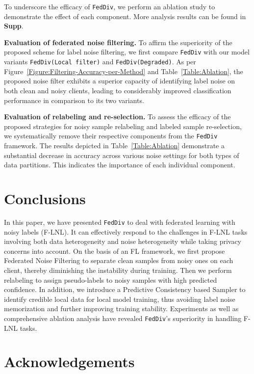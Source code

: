 \documentclass[letterpaper]{article} %
\begin{document}
To underscore the efficacy of \texttt{FedDiv}, we perform an ablation study to demonstrate the effect of each component. More analysis results can be found in \textbf{Supp}.

\noindent
\textbf{Evaluation of federated noise filtering.}
To affirm the superiority of the proposed scheme for label noise filtering, we first compare \texttt{FedDiv} with our model variants \texttt{FedDiv(Local filter)} and \texttt{FedDiv(Degraded)}. As per Figure~{\ref{Figure:Filtering-Accuracy-per-Method}} and Table~{\ref{Table:Ablation}}, the proposed noise filter exhibits a superior capacity of identifying label noise on both clean and noisy clients, leading to considerably improved classification performance in comparison to its two variants.

\noindent
\textbf{Evaluation of relabeling and re-selection.}
To assess the efficacy of the proposed strategies for noisy sample relabeling and labeled sample re-selection, we systematically remove their respective components from the \texttt{FedDiv} framework.  The results depicted in Table~{\ref{Table:Ablation}} demonstrate a substantial decrease in accuracy across various noise settings for both types of data partitions. This indicates the importance of each individual component.

\section{Conclusions}

In this paper, we have presented \texttt{FedDiv} to deal with federated learning with noisy labels (F-LNL). It can effectively respond to the challenges in F-LNL tasks involving both data heterogeneity and noise heterogeneity while taking privacy concerns into account. On the basis of an FL framework, we first propose Federated Noise Filtering to separate clean samples from noisy ones on each client, thereby diminishing the instability during training. Then we perform relabeling to assign pseudo-labels to noisy samples with high predicted confidence. In addition, we introduce a Predictive Consistency based Sampler to identify credible local data for local model training, thus avoiding label noise memorization and further improving training stability. Experiments as well as comprehensive ablation analysis have revealed \texttt{FedDiv}'s superiority in handling F-LNL tasks.

\section{Acknowledgements}
\end{document}
